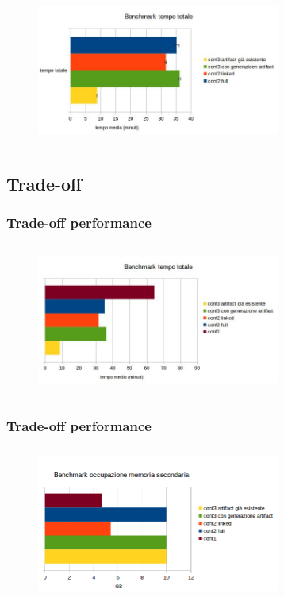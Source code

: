 \documentclass{beamer}
\theoremstyle{definition}
\theoremstyle{plain}
\begin{document}
\begin{frame}
\begin{figure}[!h]
	\begin{center}
\includegraphics[width=8cm, height=5cm]{benchmark_tempo_totale.jpg}
\end{center}
\end{figure}
\end{frame}




\subsection{Trade-off}
\begin{frame}
\frametitle{Trade-off performance}
\begin{figure}[!h]
	\begin{center}
\includegraphics[width=8cm, height=5cm]{benchmark_finale.jpg}
\end{center}
\end{figure}
\end{frame}

\begin{frame}
\frametitle{Trade-off performance}
\begin{figure}[!h]
	\begin{center}
\includegraphics[width=8cm, height=5cm]{benchmark_memoria.png}
\end{center}
\end{figure}
\end{frame}
\end{document}

